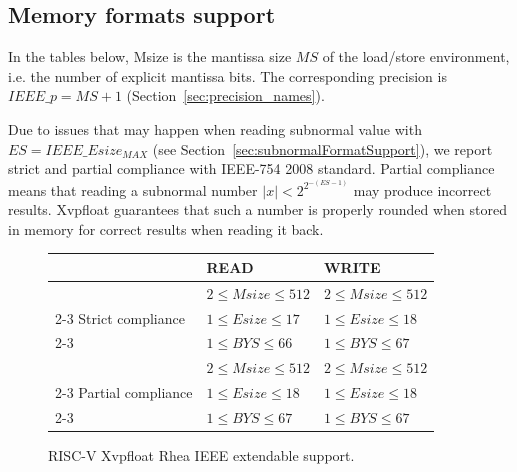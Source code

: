 \subsection{Memory formats support}

In the tables below, Msize is the mantissa size $MS$ of the load/store environment, i.e. the number of explicit mantissa bits.
The corresponding precision is $IEEE\_p = MS + 1$ (Section~\ref{sec:precision_names}).

Due to issues that may happen when reading subnormal value with $ES = IEEE\_Esize_{MAX}$ (see Section~\ref{sec:subnormalFormatSupport}), we report strict and partial compliance with IEEE-754 2008 standard.
Partial compliance means that reading a subnormal number $ |x| < 2^{2^{-(ES-1)}}$ may produce incorrect results.
Xvpfloat guarantees that such a number is properly rounded when stored in memory for correct results when reading it back.

\begin{figure}[ht]
\begin{center}
    \begin{tabular}{|l|l|l|}
    \hline
                        & READ                    & WRITE \\
    \hline
                        & $2 \leq Msize \leq 512$ & $2 \leq Msize \leq 512$ \\
    \cline{2-3}
    Strict compliance   & $1 \leq Esize \leq 17$  & $1 \leq Esize \leq 18$  \\
    \cline{2-3}
                        & $1 \leq BYS \leq 66$    & $1 \leq BYS \leq 67$    \\
    \hline
                        & $2 \leq Msize \leq 512$ & $2 \leq Msize \leq 512$ \\
    \cline{2-3}
    Partial compliance  & $1 \leq Esize \leq 18$  & $1 \leq Esize \leq 18$  \\
    \cline{2-3}
                        & $1 \leq BYS \leq 67$    & $1 \leq BYS \leq 67$    \\
    \hline
    \end{tabular}
\end{center}
\caption{RISC-V Xvpfloat Rhea IEEE extendable support.}
\label{fig:Xvpfloat_rhea_ieee_extendable}
\end{figure}

